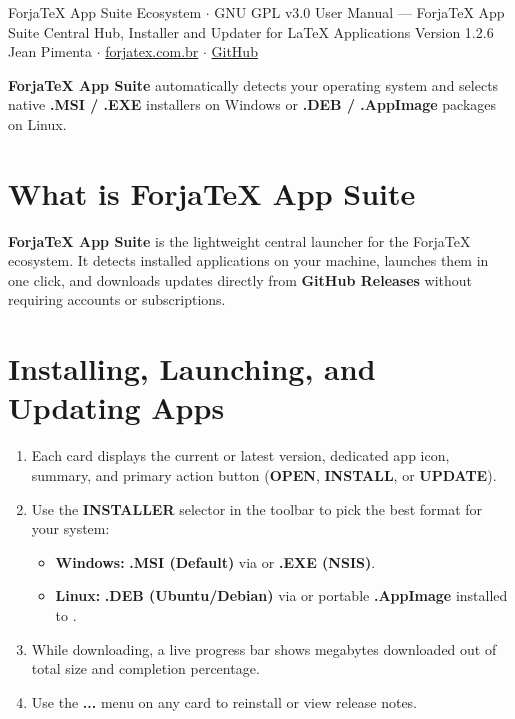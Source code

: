 \documentclass[11pt,a4paper]{article}
\begin{document}
  {ForjaTeX App Suite Ecosystem $\cdot$ GNU GPL v3.0}
  {User Manual --- ForjaTeX App Suite}
  {Central Hub, Installer and Updater for \LaTeX{} Applications}
  {Version 1.2.6}
  {Jean Pimenta $\cdot$ \href{https://forjatex.com.br}{\color{fjsky}forjatex.com.br} $\cdot$ \href{https://github.com/jeanjpimenta/forjatex-suite}{\color{fjsky}GitHub}}


\begin{fjcallout}
\textbf{ForjaTeX App Suite} automatically detects your operating system and selects native \textbf{.MSI / .EXE} installers on Windows or \textbf{.DEB / .AppImage} packages on Linux.
\end{fjcallout}

\section{What is ForjaTeX App Suite}
\textbf{ForjaTeX App Suite} is the lightweight central launcher for the ForjaTeX ecosystem. It detects installed applications on your machine, launches them in one click, and downloads updates directly from \textbf{GitHub Releases} without requiring accounts or subscriptions.

\section{Installing, Launching, and Updating Apps}
\begin{enumerate}
  \item Each card displays the current or latest version, dedicated app icon, summary, and primary action button (\textbf{OPEN}, \textbf{INSTALL}, or \textbf{UPDATE}).
  \item Use the \textbf{INSTALLER} selector in the toolbar to pick the best format for your system:
  \begin{itemize}
    \item \textbf{Windows:} \textbf{.MSI (Default)} via  or \textbf{.EXE (NSIS)}.
    \item \textbf{Linux:} \textbf{.DEB (Ubuntu/Debian)} via  or portable \textbf{.AppImage} installed to .
  \end{itemize}
  \item While downloading, a live progress bar shows megabytes downloaded out of total size and completion percentage.
  \item Use the \textbf{...} menu on any card to reinstall or view release notes.
\end{enumerate}
\end{document}
